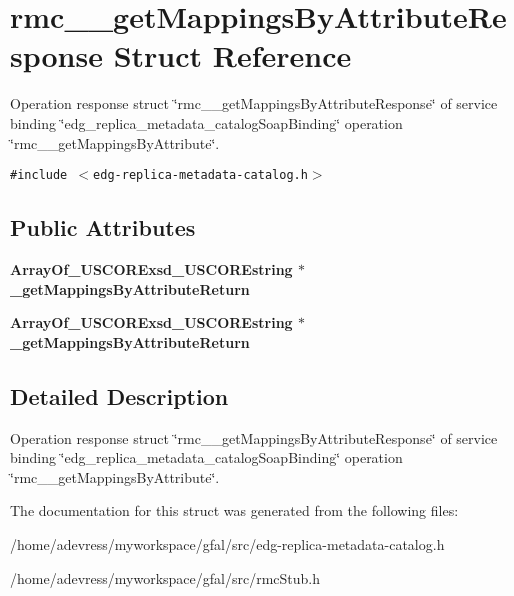 \section{rmc\_\-\_\-get\-Mappings\-By\-Attribute\-Response Struct Reference}
\label{structrmc____getMappingsByAttributeResponse}
Operation response struct \char`\"{}rmc\_\-\_\-get\-Mappings\-By\-Attribute\-Response\char`\"{} of service binding \char`\"{}edg\_\-replica\_\-metadata\_\-catalog\-Soap\-Binding\char`\"{} operation \char`\"{}rmc\_\-\_\-get\-Mappings\-By\-Attribute\char`\"{}.  


{\tt \#include $<$edg-replica-metadata-catalog.h$>$}

\subsection*{Public Attributes}
\begin{CompactItemize}
\item 
\bf{Array\-Of\_\-USCORExsd\_\-USCOREstring} $\ast$ \textbf{\_\-get\-Mappings\-By\-Attribute\-Return}\label{structrmc____getMappingsByAttributeResponse_dc6c86673edf8bc789d14bfd6c624a43}

\item 
\bf{Array\-Of\_\-USCORExsd\_\-USCOREstring} $\ast$ \textbf{\_\-get\-Mappings\-By\-Attribute\-Return}\label{structrmc____getMappingsByAttributeResponse_dc6c86673edf8bc789d14bfd6c624a43}

\end{CompactItemize}


\subsection{Detailed Description}
Operation response struct \char`\"{}rmc\_\-\_\-get\-Mappings\-By\-Attribute\-Response\char`\"{} of service binding \char`\"{}edg\_\-replica\_\-metadata\_\-catalog\-Soap\-Binding\char`\"{} operation \char`\"{}rmc\_\-\_\-get\-Mappings\-By\-Attribute\char`\"{}. 



The documentation for this struct was generated from the following files:\begin{CompactItemize}
\item 
/home/adevress/myworkspace/gfal/src/edg-replica-metadata-catalog.h\item 
/home/adevress/myworkspace/gfal/src/rmc\-Stub.h\end{CompactItemize}
